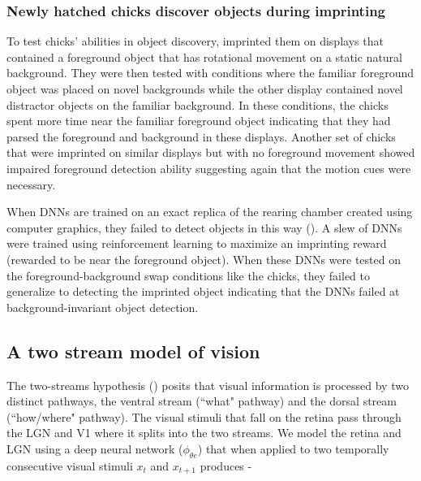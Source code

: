 \documentclass[10pt,letterpaper]{article}
\begin{document}
\subsubsection*{Newly hatched chicks discover objects during imprinting}
To test chicks' abilities in object discovery, \cite{wood2021one} imprinted them on displays that contained a foreground object that has rotational movement on a static natural background. They were then tested with conditions where the familiar foreground object was placed on novel backgrounds while the other display contained novel distractor objects on the familiar background. In these conditions, the chicks spent more time near the familiar foreground object indicating that they had parsed the foreground and background in these displays. Another set of chicks that were imprinted on similar displays but with no foreground movement showed impaired foreground detection ability suggesting again that the motion cues were necessary.

When DNNs are trained on an exact replica of the rearing chamber created using computer graphics, they failed to detect objects in this way (\cite{garimella2024newborn}). A slew of DNNs were trained using reinforcement learning to maximize an imprinting reward (rewarded to be near the foreground object). When these DNNs were tested on the foreground-background swap conditions like the chicks, they failed to generalize to detecting the imprinted object indicating that the DNNs failed at background-invariant object detection.

\subsection*{A two stream model of vision}

The two-streams hypothesis (\cite{goodale1992separate}) posits that visual information is processed by two distinct pathways, the ventral stream (``what" pathway) and the dorsal stream (``how/where" pathway). The visual stimuli that fall on the retina pass through the LGN and V1 where it splits into the two streams. We model the retina and LGN using a deep neural network ($ \phi_{\theta e}$) that when applied to two temporally consecutive visual stimuli $x_t$ and $x_{t+1}$ produces -
\end{document}
